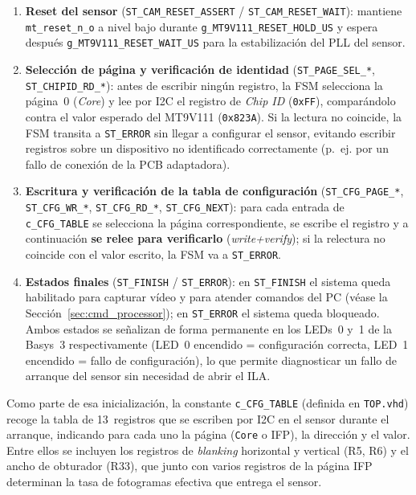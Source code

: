 \documentclass[../main.tex]{subfiles}
\begin{document}
\begin{enumerate}
    \item \textbf{Reset del sensor} (\texttt{ST\_CAM\_RESET\_ASSERT} / \texttt{ST\_CAM\_RESET\_WAIT}): mantiene \texttt{mt\_reset\_n\_o} a nivel bajo durante \texttt{g\_MT9V111\_RESET\_HOLD\_US} y espera después \texttt{g\_MT9V111\_RESET\_WAIT\_US} para la estabilización del PLL del sensor.
    \item \textbf{Selección de página y verificación de identidad} (\texttt{ST\_PAGE\_SEL\_*}, \texttt{ST\_CHIPID\_RD\_*}): antes de escribir ningún registro, la FSM selecciona la página~0 (\textit{Core}) y lee por \ac{I2C} el registro de \textit{Chip ID} (\texttt{0xFF}), comparándolo contra el valor esperado del MT9V111 (\texttt{0x823A}). Si la lectura no coincide, la FSM transita a \texttt{ST\_ERROR} sin llegar a configurar el sensor, evitando escribir registros sobre un dispositivo no identificado correctamente (p.~ej. por un fallo de conexión de la PCB adaptadora).
    \item \textbf{Escritura y verificación de la tabla de configuración} (\texttt{ST\_CFG\_PAGE\_*}, \texttt{ST\_CFG\_WR\_*}, \texttt{ST\_CFG\_RD\_*}, \texttt{ST\_CFG\_NEXT}): para cada entrada de \texttt{c\_CFG\_TABLE} se selecciona la página correspondiente, se escribe el registro y a continuación \textbf{se relee para verificarlo} (\textit{write+verify}); si la relectura no coincide con el valor escrito, la FSM va a \texttt{ST\_ERROR}.
    \item \textbf{Estados finales} (\texttt{ST\_FINISH} / \texttt{ST\_ERROR}): en \texttt{ST\_FINISH} el sistema queda habilitado para capturar vídeo y para atender comandos del PC (véase la Sección~\ref{sec:cmd_processor}); en \texttt{ST\_ERROR} el sistema queda bloqueado. Ambos estados se señalizan de forma permanente en los LEDs~0 y~1 de la Basys~3 respectivamente (LED~0 encendido = configuración correcta, LED~1 encendido = fallo de configuración), lo que permite diagnosticar un fallo de arranque del sensor sin necesidad de abrir el ILA.
\end{enumerate}

Como parte de esa inicialización, la constante \texttt{c\_CFG\_TABLE} (definida en \texttt{TOP.vhd}) recoge la tabla de 13~registros que se escriben por \ac{I2C} en el sensor durante el arranque, indicando para cada uno la página (\texttt{Core} o \ac{IFP}), la dirección y el valor. Entre ellos se incluyen los registros de \textit{blanking} horizontal y vertical (R5, R6) y el ancho de obturador (R33), que junto con varios registros de la página \ac{IFP} determinan la tasa de fotogramas efectiva que entrega el sensor.
\end{document}
